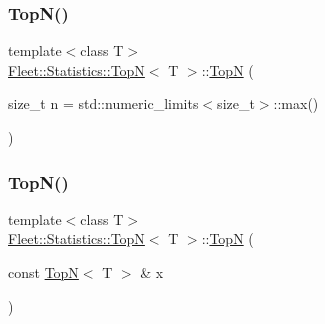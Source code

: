 \subsubsection{\texorpdfstring{Top\+N()}{TopN()}\hspace{0.1cm}{\footnotesize\ttfamily [1/3]}}
{\footnotesize\ttfamily template$<$class T$>$ \\
\hyperlink{class_fleet_1_1_statistics_1_1_top_n}{Fleet\+::\+Statistics\+::\+TopN}$<$ T $>$\+::\hyperlink{class_fleet_1_1_statistics_1_1_top_n}{TopN} (\begin{DoxyParamCaption}\item[{size\+\_\+t}]{n = {\ttfamily std\+:\+:numeric\+\_\+limits$<$size\+\_\+t$>$\+:\+:max()} }\end{DoxyParamCaption})\hspace{0.3cm}{\ttfamily [inline]}}

\mbox{\label{class_fleet_1_1_statistics_1_1_top_n_a3c7b5c9c3fd6e171a0b2d6b1f48cddf3}} 
\subsubsection{\texorpdfstring{Top\+N()}{TopN()}\hspace{0.1cm}{\footnotesize\ttfamily [2/3]}}
{\footnotesize\ttfamily template$<$class T$>$ \\
\hyperlink{class_fleet_1_1_statistics_1_1_top_n}{Fleet\+::\+Statistics\+::\+TopN}$<$ T $>$\+::\hyperlink{class_fleet_1_1_statistics_1_1_top_n}{TopN} (\begin{DoxyParamCaption}\item[{const \hyperlink{class_fleet_1_1_statistics_1_1_top_n}{TopN}$<$ T $>$ \&}]{x }\end{DoxyParamCaption})\hspace{0.3cm}{\ttfamily [inline]}}

\mbox{\label{class_fleet_1_1_statistics_1_1_top_n_af1a27643fa0841afaa7e8ca0e87d9a49}} 
